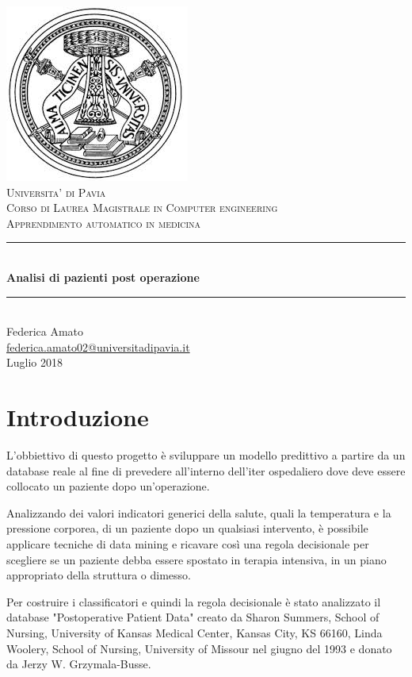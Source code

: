 \documentclass[a4paper, 12p]{report}
\begin{document}
\begin{titlepage}
	\centering
	\includegraphics[scale = 0.4]{img/logo.jpeg}\\[1.0 cm]
	\textsc{\LARGE Universita' di Pavia}\\[1.0 cm]
	\textsc{\LARGE Corso di Laurea Magistrale in Computer engineering}\\[1 cm]
	\textsc{\Large Apprendimento automatico in medicina}\\[0.5 cm]
	\rule{\linewidth}{0.2 mm} \\[0.4 cm]
	{\huge{\textbf{Analisi di pazienti post operazione}}}\\
	\rule{\linewidth}{0.2 mm} \\[1 cm]

	{\large Federica Amato} \\[0.2 cm]
	\url{federica.amato02@universitadipavia.it}
	 \\[0.2 cm]
	{Luglio 2018}
\end{titlepage}

\tableofcontents
\chapter{Introduzione}
L'obbiettivo di questo progetto è sviluppare un modello predittivo a partire da un database reale al fine di prevedere all'interno dell'iter ospedaliero dove deve essere collocato un paziente dopo un'operazione. 

\noindent Analizzando dei valori indicatori generici della salute, quali la temperatura e la pressione corporea, di un paziente dopo un qualsiasi intervento, è possibile applicare tecniche di data mining e ricavare così una regola decisionale per scegliere se un paziente debba essere spostato in terapia intensiva, in un piano appropriato della struttura o dimesso.

\noindent Per costruire i classificatori e quindi la regola decisionale è stato analizzato il database "Postoperative Patient Data" creato da Sharon Summers, School of Nursing, University of Kansas Medical Center, Kansas City, KS 66160, Linda Woolery, School of Nursing, University of Missour nel giugno del 1993 e donato  da Jerzy W. Grzymala-Busse. 
\end{document}
